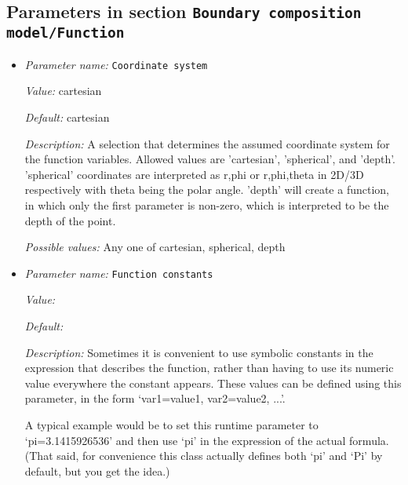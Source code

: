 \subsection{Parameters in section \tt Boundary composition model/Function}
\label{parameters:Boundary_20composition_20model/Function}

\begin{itemize}
\item {\it Parameter name:} {\tt Coordinate system}
\label{parameters:Boundary composition model/Function/Coordinate system}
\label{parameters:Boundary_20composition_20model/Function/Coordinate_20system}


{\it Value:} cartesian


{\it Default:} cartesian


{\it Description:} A selection that determines the assumed coordinate system for the function variables. Allowed values are 'cartesian', 'spherical', and 'depth'. 'spherical' coordinates are interpreted as r,phi or r,phi,theta in 2D/3D respectively with theta being the polar angle. 'depth' will create a function, in which only the first parameter is non-zero, which is interpreted to be the depth of the point.


{\it Possible values:} Any one of cartesian, spherical, depth
\item {\it Parameter name:} {\tt Function constants}
\label{parameters:Boundary composition model/Function/Function constants}
\label{parameters:Boundary_20composition_20model/Function/Function_20constants}


{\it Value:} 


{\it Default:} 


{\it Description:} Sometimes it is convenient to use symbolic constants in the expression that describes the function, rather than having to use its numeric value everywhere the constant appears. These values can be defined using this parameter, in the form `var1=value1, var2=value2, ...'.

A typical example would be to set this runtime parameter to `pi=3.1415926536' and then use `pi' in the expression of the actual formula. (That said, for convenience this class actually defines both `pi' and `Pi' by default, but you get the idea.)



\end{itemize}
